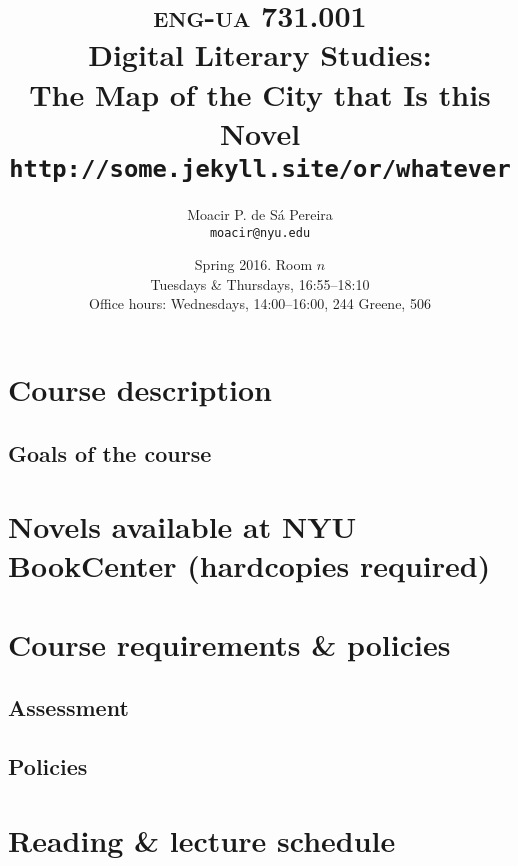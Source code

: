 \documentclass[11pt,article,oneside]{memoir}
\makeatletter
\def\myauthor{Author}
\def\mytitle{Title}
\def\myaddress{}
\def\myemail{}
\def\mycoursecode{}
\def\mycoursename{}
\def\mycoursetime{}
\def\mycourseurl{}
\def\myterm{}
\def\myofficehours{}
\def\mycoursecode{eng-ua 731.001}
\def\mycoursename{Digital Literary Studies:\\ The Map of the City that Is this Novel}
\def\myterm{Spring 2016}
\def\myaddress{Room $n$}
\def\myemail{moacir@nyu.edu}
\def\myauthor{Moacir P. de Sá Pereira}
\def\mytitle{{\normalsize \textsc{\mycoursecode}\\} \HUGE \mycoursename}
\def\mycoursetime{Tuesdays \& Thursdays, 16:55--18:10}
\def\mycourseurl{http://some.jekyll.site/or/whatever}
\def\myofficehours{Wednesdays, 14:00--16:00, 244 Greene, 506}
\makeatother
\begin{document}
 \setsansfont[Mapping=tex-text]{Helvetica} 
 \setmonofont[Mapping=tex-text,Scale=0.8]{DejaVu Sans Mono}

\title{\LARGE \mytitle \\ \Large\texttt{\mycourseurl}}     
\author{\Large\myauthor\\ \footnotesize\texttt{\noindent\myemail}}
\date{\myterm. \myaddress \\ \mycoursetime \\ \small Office hours: \myofficehours}

\maketitle


\section*{Course description}


\subsection*{Goals of the course}

     
\section*{Novels available at NYU BookCenter \small (hardcopies required)}

	
\section*{Course requirements \& policies}

  \subsection*{Assessment}
  

	\subsection*{Policies}
	

\newpage

\section*{Reading \& lecture schedule}


\newpage


\newpage
\printbibliography 
\end{document}

